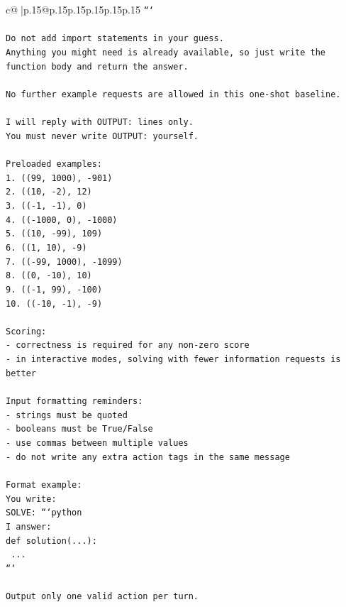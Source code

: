\documentclass{article}
\begin{document}
{\begin{supertabular}{c@{$\;$}|p{.15\linewidth}@{}p{.15\linewidth}p{.15\linewidth}p{.15\linewidth}p{.15\linewidth}p{.15\linewidth}}
{{{\texttt{```} \\
\\ 
\texttt{Do not add import statements in your guess.} \\
\texttt{Anything you might need is already available, so just write the function body and return the answer.} \\
\\ 
\texttt{No further example requests are allowed in this one{-}shot baseline.} \\
\\ 
\texttt{I will reply with OUTPUT: lines only.} \\
\texttt{You must never write OUTPUT: yourself.} \\
\\ 
\texttt{Preloaded examples:} \\
\texttt{1. ((99, 1000), {-}901)} \\
\texttt{2. ((10, {-}2), 12)} \\
\texttt{3. (({-}1, {-}1), 0)} \\
\texttt{4. (({-}1000, 0), {-}1000)} \\
\texttt{5. ((10, {-}99), 109)} \\
\texttt{6. ((1, 10), {-}9)} \\
\texttt{7. (({-}99, 1000), {-}1099)} \\
\texttt{8. ((0, {-}10), 10)} \\
\texttt{9. (({-}1, 99), {-}100)} \\
\texttt{10. (({-}10, {-}1), {-}9)} \\
\\ 
\texttt{Scoring:} \\
\texttt{{-} correctness is required for any non{-}zero score} \\
\texttt{{-} in interactive modes, solving with fewer information requests is better} \\
\\ 
\texttt{Input formatting reminders:} \\
\texttt{{-} strings must be quoted} \\
\texttt{{-} booleans must be True/False} \\
\texttt{{-} use commas between multiple values} \\
\texttt{{-} do not write any extra action tags in the same message} \\
\\ 
\texttt{Format example:} \\
\texttt{You write:} \\
\texttt{SOLVE: ```python} \\
\texttt{I answer:} \\
\texttt{def solution(...):} \\
\texttt{    ...} \\
\texttt{```} \\
\\ 
\texttt{Output only one valid action per turn.} \\
            }
        }
    }
     \\ \\


\end{supertabular}}
\end{document}
